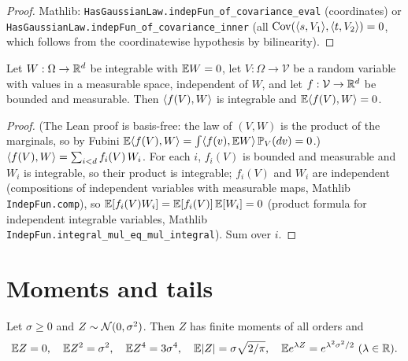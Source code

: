 \begin{proof}
\leanok
{}
Mathlib: \texttt{HasGaussianLaw.indepFun\_of\_covariance\_eval} (coordinates) or
\texttt{HasGaussianLaw.indepFun\_of\_covariance\_inner} (all $\operatorname{Cov}(\langle s, V_1 \rangle,
\langle t, V_2 \rangle) = 0$, which follows from the coordinatewise hypothesis by bilinearity).
\end{proof}

\begin{lemma}
\label{lem:indep_integral_zero}
\leanok
Let $W : \Omega \to \mathbb{R}^d$ be integrable with $\mathbb{E} W = 0$, let $V : \Omega \to \mathcal V$ be a
random variable with values in a measurable space, independent of $W$, and let
$f : \mathcal V \to \mathbb{R}^d$ be bounded and measurable. Then $\langle f(V), W \rangle$ is integrable and
$\mathbb{E}\langle f(V), W \rangle = 0$.
\end{lemma}

\begin{proof}
\leanok
(The Lean proof is basis-free: the law of $(V, W)$ is the product of the marginals, so by
Fubini $\mathbb{E}\langle f(V), W \rangle = \int\langle f(v), \mathbb{E} W \rangle\,\mathbb{P}_V(dv) = 0$.)
$\langle f(V), W \rangle = \sum_{i<d} f_i(V)\,W_i$. For each $i$, $f_i(V)$ is bounded and measurable and
$W_i$ is integrable, so their product is integrable; $f_i(V)$ and $W_i$ are independent
(compositions of independent variables with measurable maps, Mathlib \texttt{IndepFun.comp}),
so $\mathbb{E}[f_i(V)W_i] = \mathbb{E}[f_i(V)]\,\mathbb{E}[W_i] = 0$ (product formula for independent integrable
variables, Mathlib \texttt{IndepFun.integral\_mul\_eq\_mul\_integral}). Sum over $i$.
\end{proof}

\section{Moments and tails}
\label{sec:pre_gaussian_moments}

\begin{lemma}\label{lem:gauss_1d_moments}
Let $\sigma \ge 0$ and $Z \sim \mathcal{N}(0,\sigma^2)$. Then $Z$ has finite moments of all
orders and
\[
  \mathbb{E} Z = 0,\quad \mathbb{E} Z^2 = \sigma^2,\quad \mathbb{E} Z^4 = 3\sigma^4,\quad
  \mathbb{E}\lvert Z \rvert = \sigma\sqrt{2/\pi},\quad \mathbb{E} e^{\lambda Z} = e^{\lambda^2\sigma^2/2}\ (\lambda\in\mathbb{R}).
\]
\end{lemma}


